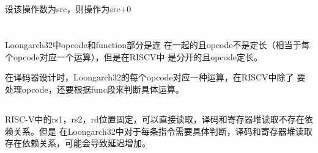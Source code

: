 \documentclass[12pt,a4paper]{ctexart}
\begin{document}
\subsection{}
设该操作数为src，则操作为src+0
\section{}
\subsection{}
Loongarch32中opcode和function部分是连
在一起的且opcode不是定长（相当于每个opcode对应一个运算），但是在RISCV中
是分开的且opcode定长。\par
在译码器设计时，Loongarch32的每个opcode对应一种运算，在RISCV中除了
要处理opcode，还要根据func段来判断具体运算。
\subsection{}
RISC-V中的rs1，rs2，rd位置固定，可以直接读取，译码和寄存器堆读取不存在依赖关系。但是
在Loongarch32中对于每条指令需要具体判断，译码和寄存器堆读取存在依赖关系，可能会导致延迟增加。
\end{document}
